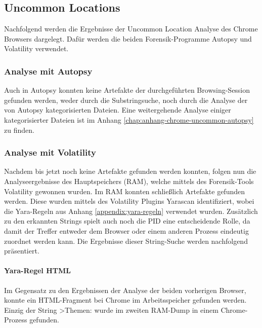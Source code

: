 \subsection*{Uncommon Locations}\label{chap:ergebnisse-chrome-uncommon-locations}

Nachfolgend werden die Ergebnisse der Uncommon Location Analyse des Chrome Browsers dargelegt. Dafür werden die beiden Forensik-Programme Autopsy und Volatility verwendet.

\subsubsection*{Analyse mit Autopsy}\label{chap:ergebnisse-chrome-uncommon-autopsy}

Auch in Autopsy konnten keine Artefakte der durchgeführten Browsing-Session gefunden werden, weder durch die Substringsuche, noch durch die Analyse der von Autopsy kategorisierten Dateien. Eine weitergehende Analyse einiger kategorisierter Dateien ist im Anhang \ref{chap:anhang-chrome-uncommon-autopsy} zu finden.

\subsubsection*{Analyse mit Volatility}\label{chap:ergebnisse-chrome-uncommon-volatility}

Nachdem bis jetzt noch keine Artefakte gefunden werden konnten, folgen nun die Analyseergebnisse des Hauptspeichers (RAM), welche mittels des Forensik-Tools Volatility gewonnen wurden. Im RAM konnten schließlich Artefakte gefunden werden. Diese wurden mittels des Volatility Plugins Yarascan identifiziert, wobei die Yara-Regeln aus Anhang \ref{appendix:yara-regeln} verwendet wurden. Zusätzlich zu den erkannten Strings spielt auch noch die PID eine entscheidende Rolle, da damit der Treffer entweder dem Browser oder einem anderen Prozess eindeutig zuordnet werden kann. Die Ergebnisse dieser String-Suche werden nachfolgend präsentiert.

\paragraph*{Yara-Regel \glqq{}HTML\grqq{}}\label{chap:ergebnisse-chrome-uncommon-volatility-html}

Im Gegensatz zu den Ergebnissen der Analyse der beiden vorherigen Browser, konnte ein HTML-Fragment bei Chrome im Arbeitsspeicher gefunden werden. Einzig der String \glqq{}>Themen:\grqq{} wurde im zweiten RAM-Dump in einem Chrome-Prozess gefunden.

